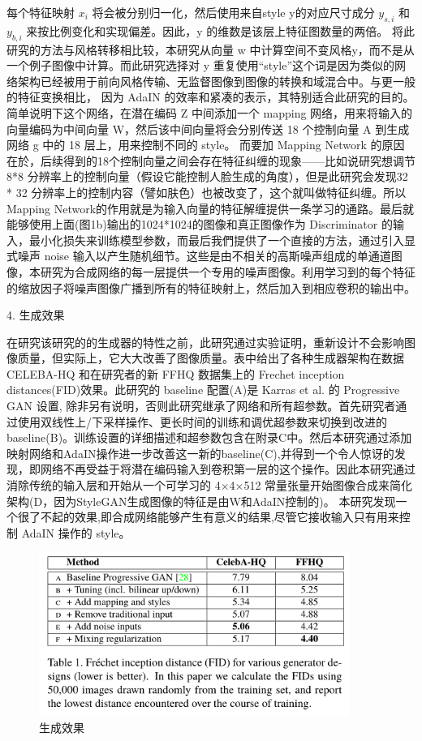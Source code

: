 每个特征映射 $x_i$ 将会被分别归一化，然后使用来自style y的对应尺寸成分 $y_{s,i}$ 和 $y_{b,i}$ 来按比例变化和实现偏差。因此，y 的维数是该层上特征图数量的两倍。
将此研究的方法与风格转移相比较，本研究从向量 w 中计算空间不变风格y，而不是从一个例子图像中计算。而此研究选择对 y 重复使用“style”这个词是因为类似的网络架构已经被用于前向风格传输、无监督图像到图像的转换和域混合中。与更一般的特征变换相比， 因为 AdaIN 的效率和紧凑的表示，其特别适合此研究的目的。简单说明下这个网络，在潜在编码 Z 中间添加一个 mapping 网络，用来将输入的向量编码为中间向量 W，然后该中间向量将会分别传送 18 个控制向量 A 到生成网络 g 中的 18 层上，用来控制不同的 style。
而要加 Mapping Network 的原因在於，后续得到的18个控制向量之间会存在特征纠缠的现象——比如说研究想调节 8*8 分辨率上的控制向量（假设它能控制人脸生成的角度），但是此研究会发现32 * 32 分辨率上的控制内容（譬如肤色）也被改变了，这个就叫做特征纠缠。所以Mapping Network的作用就是为输入向量的特征解缠提供一条学习的通路。最后就能够使用上面(图1b)输出的1024*1024的图像和真正图像作为 Discriminator 的输入，最小化损失来训练模型参数，而最后我們提供了一个直接的方法，通过引入显式噪声 noise 输入以产生随机细节。这些是由不相关的高斯噪声组成的单通道图像，本研究为合成网络的每一层提供一个专用的噪声图像。利用学习到的每个特征的缩放因子将噪声图像广播到所有的特征映射上，然后加入到相应卷积的输出中。

4. 生成效果

在研究该研究的的生成器的特性之前，此研究通过实验证明，重新设计不会影响图像质量，但实际上，它大大改善了图像质量。表中给出了各种生成器架构在数据 CELEBA-HQ 和在研究者的新 FFHQ 数据集上的 Frechet inception distances(FID)效果。此研究的 baseline 配置(A)是 Karras et al. 的 Progressive GAN 设置, 除非另有说明，否则此研究继承了网络和所有超参数。首先研究者通过使用双线性上/下采样操作、更长时间的训练和调优超参数来切换到改进的baseline(B)。训练设置的详细描述和超参数包含在附录C中。然后本研究通过添加映射网络和AdaIN操作进一步改善这一新的baseline(C),并得到一个令人惊讶的发现，即网络不再受益于将潜在编码输入到卷积第一层的这个操作。因此本研究通过消除传统的输入层和开始从一个可学习的 4×4×512 常量张量开始图像合成来简化架构(D，因为StyleGAN生成图像的特征是由W和AdaIN控制的)。 本研究发现一个很了不起的效果,即合成网络能够产生有意义的结果,尽管它接收输入只有用来控制 AdaIN 操作的 style。

\begin{figure}[htb]
\centering 
\includegraphics[width=0.9\textwidth]{img/m2t25.png} 
\caption{生成效果}
\label{Test}
\end{figure}


